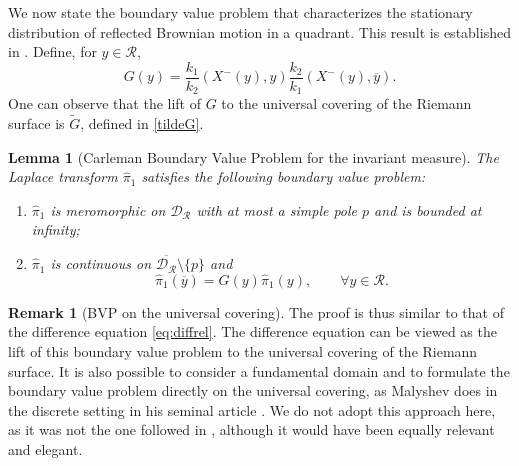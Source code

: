 \documentclass[11pt]{article}
\newcommand\citeS[1]{\cite{#1}}
\newcommand{\R}{\mathcal{R}}
\newcommand{\G}{\mathcal{D}_\mathcal{R}}
\newtheorem{lemm}[thm]{Lemma}
\theoremstyle{definition}
\newtheorem{rem}[thm]{Remark}
\begin{document}
We now state the boundary value problem that characterizes the stationary distribution of reflected Brownian motion in a quadrant. This result is established in \citeS{franceschi_raschel_integral_2019}.
Define, for $y\in \R$,
\begin{equation}
\label{intro:eq:G}
     G(y)=\frac{k_1}{k_2}(X^-(y),y)\frac{k_2}{k_1}(X^-(y),\overline{y}).
\end{equation}     
One can observe that the lift of $G$ to the universal covering of the Riemann surface is $\widetilde G$, defined in \eqref{tildeG}. 
\begin{lemm}[Carleman Boundary Value Problem for the invariant measure]
\label{prop:BVP_general0}
The Laplace transform $\widehat \pi_1$ satisfies the following boundary value problem:
\begin{enumerate}[label={\rm (\roman{*})},ref={\rm (\roman{*})}]
     \item\label{item:1_BVP0_general} $\widehat \pi_1$ is meromorphic on $\G$ with at most a simple pole $p$ and is bounded at infinity;   
     \item\label{item:2_BVP0_general} $\widehat \pi_1$ is continuous on $\overline{\G}\setminus \{p\}$ and
\begin{equation}
\label{eq:boundary_condition_general1}
     \widehat \pi_1(\overline{y})=G(y)\widehat \pi_1({y}), \qquad \forall y\in \R.
\end{equation}
\end{enumerate}
\end{lemm} 
\begin{rem}[BVP on the universal covering]
The proof is thus similar to that of the difference equation \eqref{eq:diffrel}. The difference equation can be viewed as the lift of this boundary value problem to the universal covering of the Riemann surface. It is also possible to consider a fundamental domain and to formulate the boundary value problem directly on the universal covering, as Malyshev does in the discrete setting in his seminal article \cite{malysev_analytic_1972}. We do not adopt this approach here, as it was not the one followed in \citeS{franceschi_raschel_integral_2019}, although it would have been equally relevant and elegant.
\end{rem}
\end{document}
